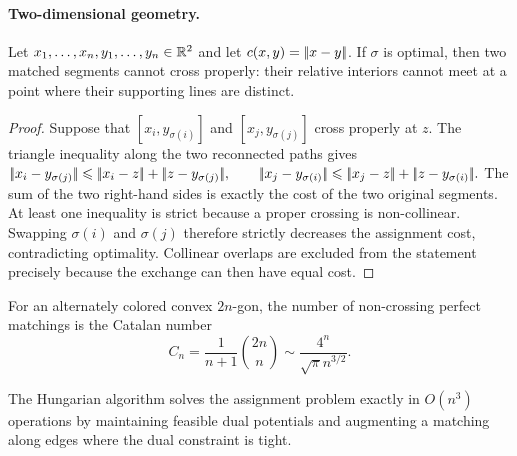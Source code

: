 \paragraph{Two-dimensional geometry.}
\begin{proposition}\label{prop-planar-no-proper-crossing}
Let $x_1,\ldots,x_n,y_1,\ldots,y_n\in\mathbb{R}^2$ and let $c(x,y)=|\!| x-y |\!|$. If $\sigma$ is optimal, then two matched segments cannot cross properly: their relative interiors cannot meet at a point where their supporting lines are distinct.
\end{proposition}
\begin{proof}
Suppose that $[x_i,y_{\sigma(i)}]$ and $[x_j,y_{\sigma(j)}]$ cross properly at $z$. The triangle inequality along the two reconnected paths gives
\(\norm{x_i-y_{\sigma(j)}} \leq \norm{x_i-z}+\norm{z-y_{\sigma(j)}} ,\qquad \norm{x_j-y_{\sigma(i)}} \leq \norm{x_j-z}+\norm{z-y_{\sigma(i)}}.\)
The sum of the two right-hand sides is exactly the cost of the two original segments. At least one inequality is strict because a proper crossing is non-collinear. Swapping $\sigma(i)$ and $\sigma(j)$ therefore strictly decreases the assignment cost, contradicting optimality. Collinear overlaps are excluded from the statement precisely because the exchange can then have equal cost.
\end{proof}
For an alternately colored convex $2n$-gon, the number of non-crossing perfect matchings is the Catalan number
\[
C_n=\frac{1}{n+1}\binom{2n}{n}\sim \frac{4^n}{\sqrt{\pi}n^{3/2}}.
\]

The Hungarian algorithm solves the assignment problem exactly in $O(n^3)$ operations by maintaining feasible dual potentials and augmenting a matching along edges where the dual constraint is tight.
